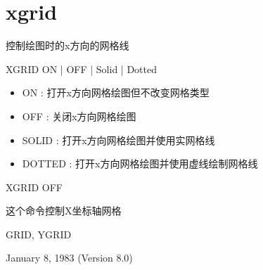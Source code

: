 \section{xgrid}
\label{cmd:xgrid}

控制绘图时的x方向的网格线

XGRID ON | OFF | Solid | Dotted

\begin{itemize}
\item ON : 打开x方向网格绘图但不改变网格类型 
\item OFF : 关闭x方向网格绘图 
\item SOLID : 打开x方向网格绘图并使用实网格线 
\item DOTTED : 打开x方向网格绘图并使用虚线绘制网格线 
\end{itemize}

XGRID OFF

这个命令控制X坐标轴网格

GRID, YGRID

January 8, 1983 (Version 8.0)

